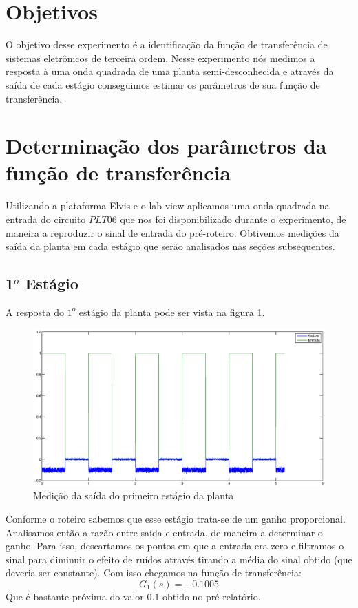 \documentclass{article}
\begin{document}


\onehalfspacing
\section{Objetivos} 
O objetivo desse experimento é a identificação da função de transferência de sistemas eletrônicos de terceira ordem. Nesse experimento nós medimos a resposta à uma onda quadrada de uma planta semi-desconhecida e através da saída de cada estágio conseguimos estimar os parâmetros de sua função de transferência. 
	
\section{Determinação dos parâmetros da função de transferência}
Utilizando a plataforma Elvis e o lab view aplicamos uma onda quadrada na entrada do circuito $PLT06$ que nos foi disponibilizado durante o experimento, de maneira a reproduzir o sinal de entrada do pré-roteiro. Obtivemos medições da saída da planta em cada estágio que serão analisados nas seções subsequentes.

\subsection{1$^o$ Estágio}
A resposta do $1^o$ estágio da planta pode ser vista na figura \ref{fig:saida1}.
\begin{figure}[H]
	\centering
	\includegraphics[width=\linewidth]{saida1}
	\caption{Medição da saída do primeiro estágio da planta}
	\label{fig:saida1}
\end{figure}
Conforme o roteiro \cite{bb:roteiro} sabemos que esse estágio trata-se de um ganho proporcional.
Analisamos então a razão entre saída e entrada, de maneira a determinar o ganho. Para isso, descartamos os pontos em que a entrada era zero e filtramos o sinal para diminuir o efeito de ruídos através tirando a média do sinal obtido (que deveria ser constante).
Com isso chegamos na função de transferência:
\begin{equation}
	\label{eq:g1}
	G_1(s) = -0.1005
\end{equation}
Que é bastante próxima do valor $0.1$ obtido no pré relatório.
\end{document}
